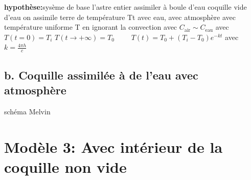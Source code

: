 \documentclass[a4paper,12pt]{article}
\begin{document}
\vspace{0.5cm}
\textbf{hypothèse:}sysème de base l'astre entier assimiler à boule d'eau 
coquille vide d'eau 
on assimile terre de température Tt avec eau, avec atmosphère avec température uniforme T  en ignorant la convection 
avec \(C_{\text{air}}\sim C_{\text{eau}}\)
avec  $T(t=0) = T_i$ 
$T(t \to +\infty) = T_0$  \ \ \ \
$T(t) = T_0 + (T_i - T_0)e^{-kt}$ \quad avec $k = \frac{4\pi h}{c}$
\subsection{b. Coquille assimilée à de l'eau avec atmosphère }
schéma Melvin

\section{Modèle 3: Avec intérieur de la coquille non vide }


 
\vspace{1cm}
\end{document}
